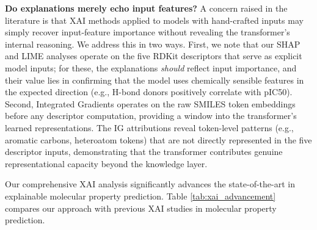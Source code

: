 \documentclass[preprint,12pt]{elsarticle}
\begin{document}
\textbf{Do explanations merely echo input features?}
A concern raised in the literature is that XAI methods applied to models with hand-crafted inputs may simply recover input-feature importance without revealing the transformer's internal reasoning. We address this in two ways. First, we note that our SHAP and LIME analyses operate on the five RDKit descriptors that serve as explicit model inputs; for these, the explanations \emph{should} reflect input importance, and their value lies in confirming that the model uses chemically sensible features in the expected direction (e.g., H-bond donors positively correlate with pIC50). Second, Integrated Gradients operates on the raw SMILES token embeddings before any descriptor computation, providing a window into the transformer's learned representations. The IG attributions reveal token-level patterns (e.g., aromatic carbons, heteroatom tokens) that are not directly represented in the five descriptor inputs, demonstrating that the transformer contributes genuine representational capacity beyond the knowledge layer.


Our comprehensive XAI analysis significantly advances the state-of-the-art in explainable molecular property prediction. Table \ref{tab:xai_advancement} compares our approach with previous XAI studies in molecular property prediction.


\begin{table}[H]
\centering
\caption{Advancement Over Previous XAI Studies}
\vspace{0.7em}

\label{tab:xai_advancement}
\end{table}
\end{document}

